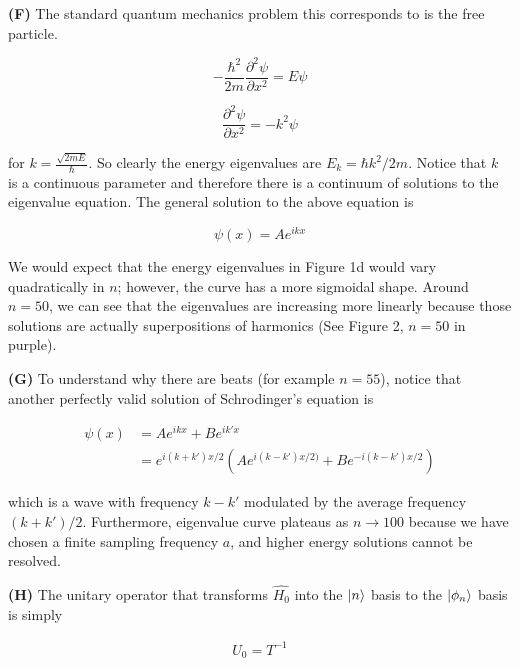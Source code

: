 \documentclass[12pt]{article}
\theoremstyle{definition}
\begin{document}
{\vspace{0.1in}
\noindent \textbf{(F)} The standard quantum mechanics problem this corresponds to is the free particle.

\begin{equation*}
-\frac{\hbar^{2}}{2m}\frac{\partial^{2}\psi}{\partial x^{2}} = E\psi
\end{equation*}

\begin{equation*}
\frac{\partial^{2}\psi}{\partial x^{2}} = -k^{2}\psi
\end{equation*}

for $k = \frac{\sqrt{2mE}}{\hbar}$. So clearly the energy eigenvalues are $E_{k} = \hbar k^{2}/2m$. Notice that $k$ is a continuous parameter and therefore there is a continuum of solutions to the eigenvalue equation. The general solution to the above equation is

\begin{equation*}
\psi(x) = Ae^{ikx}
\end{equation*}

We would expect that the energy eigenvalues in Figure 1d would vary quadratically in $n$; however, the curve has a more sigmoidal shape. Around $n=50$, we can see that the eigenvalues are increasing more linearly because those solutions are actually superpositions of harmonics (See Figure 2, $n=50$ in purple). 

\vspace{0.1in}
\noindent \textbf{(G)} To understand why there are beats (for example $n=55$), notice that another perfectly valid solution of Schrodinger's equation is


\begin{align*}
\psi(x) &= Ae^{ikx} + Be^{ik'x} \\
&= e^{i(k+k')x/2}\left(Ae^{i(k-k')x/2)} + Be^{-i(k-k')x/2}\right)
\end{align*}

which is a wave with frequency $k-k'$ modulated by the average frequency $(k+k')/2$. 
Furthermore, eigenvalue curve plateaus as $n\rightarrow 100$ because we have chosen a finite sampling frequency $a$, and higher energy solutions cannot be resolved.

\vspace{0.1in}
\noindent \textbf{(H)} The unitary operator that transforms $\hat{H_{0}}$ into the $\ket{n}$ basis to the $\ket{\phi_{n}}$ basis is simply

\begin{align*}
U_{0} = T^{-1}
\end{align*}

}
\end{document}
